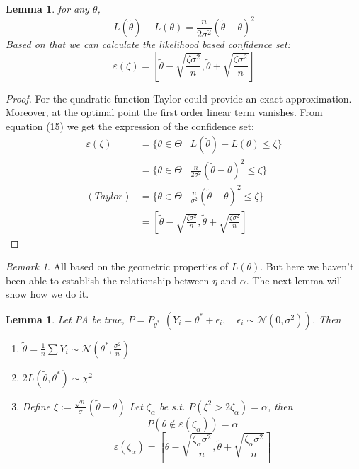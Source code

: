 \documentclass[a4paper,12pt, oneside, fleqn]{book}
\newtheorem{lemma}[theorem]{Lemma}
\theoremstyle{definition}
\theoremstyle{remark}
\newtheorem*{remark}{Remark}
\begin{document}
\begin{lemma}
	for any $\theta$, 
	\begin{equation}
		L(\tilde{\theta}) - L(\theta) = \frac{n}{2 \sigma^2}(\tilde{\theta} - \theta)^2
	\end{equation}
	Based on that we can calculate the likelihood based confidence set:
	\begin{equation*}
		\varepsilon(\zeta) = \left[\tilde{\theta} - \sqrt{\frac{\zeta \sigma^2}{n}}, \tilde{\theta} + \sqrt{\frac{\zeta \sigma^2}{n}} \right ]
	\end{equation*}
\end{lemma}

\begin{proof}
	For the quadratic function Taylor could provide an exact approximation. Moreover, at the optimal point the first order linear term vanishes. From equation (15) we get the expression of the confidence set:
	\begin{align*}
		\varepsilon(\zeta) &= \{ \theta \in \Theta \mid L(\tilde{\theta}) - L(\theta) \leq \zeta \} \\
		&= \{ \theta \in \Theta \mid \frac{n}{2 \sigma^2}(\tilde{\theta} - \theta)^2 \leq \zeta \}\\
		(Taylor) &=  \{ \theta \in \Theta \mid \frac{n}{\sigma^2}(\tilde{\theta} - \theta)^2 \leq \zeta \}\\
		&= \left[\tilde{\theta} - \sqrt{\frac{\zeta \sigma^2}{n}}, \tilde{\theta} + \sqrt{\frac{\zeta \sigma^2}{n}} \right ]
	\end{align*}
\end{proof}

\begin{remark}
All based on the geometric properties of $L(\theta)$. But here we haven't been able to establish the relationship between $\eta$ and $\alpha$. The next lemma will show how we do it.
\end{remark}

\begin{lemma}
	Let PA be true, $P = P_{\theta^*}$ $(Y_i = \theta^* + \epsilon_i, \quad \epsilon_i \sim \mathcal{N}(0, \sigma^2))$. Then
	\begin{enumerate}
		\item $\tilde{\theta} = \frac{1}{n} \sum Y_i \sim \mathcal{N}(\theta^*, \frac{\sigma^2}{n})$
		\item $2L(\tilde{\theta}, \theta^*) \sim \chi^2$
		\item Define $\xi := \frac{\sqrt{n}}{\sigma}(\tilde{\theta} - \theta)$ Let $\zeta_\alpha$ be s.t. $P(\xi^2 > 2 \zeta_\alpha) = \alpha$, then
		\begin{equation*}
			P(\theta \notin \varepsilon(\zeta_\alpha)) = \alpha
		\end{equation*}
		\begin{equation*}
			\varepsilon(\zeta_\alpha) = \left[\tilde{\theta} - \sqrt{\frac{\zeta_\alpha \sigma^2}{n}}, \tilde{\theta} + \sqrt{\frac{\zeta_\alpha \sigma^2}{n}} \right ]
		\end{equation*}
	\end{enumerate}
\end{lemma}
\end{document}
